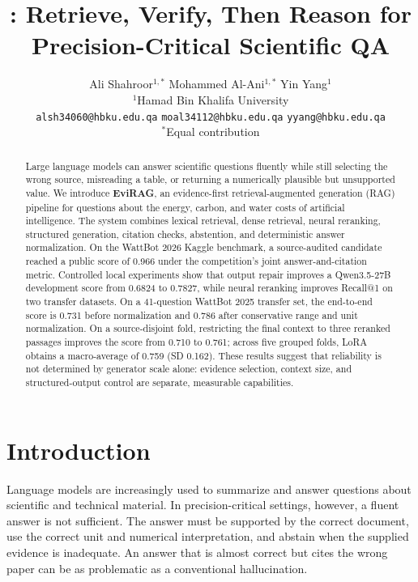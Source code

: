 \documentclass[11pt]{article}
\title{\method: Retrieve, Verify, Then Reason for Precision-Critical Scientific QA}
\author{
  Ali Shahroor$^{1,*}$ \quad
  Mohammed Al-Ani$^{1,*}$ \quad
  Yin Yang$^{1}$ \\
  $^{1}$Hamad Bin Khalifa University \\
  \texttt{alsh34060@hbku.edu.qa} \quad
  \texttt{moal34112@hbku.edu.qa} \quad
  \texttt{yyang@hbku.edu.qa} \\
  \small $^*$Equal contribution
}
\newcommand{\method}{\textbf{EviRAG}}
\begin{document}
\maketitle
{}

\begin{abstract}
Large language models can answer scientific questions fluently while still selecting the wrong source, misreading a table, or returning a numerically plausible but unsupported value. We introduce \method, an evidence-first retrieval-augmented generation (RAG) pipeline for questions about the energy, carbon, and water costs of artificial intelligence. The system combines lexical retrieval, dense retrieval, neural reranking, structured generation, citation checks, abstention, and deterministic answer normalization. On the WattBot 2026 Kaggle benchmark, a source-audited candidate reached a public score of 0.966 under the competition's joint answer-and-citation metric. Controlled local experiments show that output repair improves a Qwen3.5-27B development score from 0.6824 to 0.7827, while neural reranking improves Recall@1 on two transfer datasets. On a 41-question WattBot 2025 transfer set, the end-to-end score is 0.731 before normalization and 0.786 after conservative range and unit normalization. On a source-disjoint fold, restricting the final context to three reranked passages improves the score from 0.710 to 0.761; across five grouped folds, LoRA obtains a macro-average of 0.759 (SD 0.162). These results suggest that reliability is not determined by generator scale alone: evidence selection, context size, and structured-output control are separate, measurable capabilities.
\end{abstract}

\section{Introduction}
\label{sec:intro}
Language models are increasingly used to summarize and answer questions about scientific and technical material. In precision-critical settings, however, a fluent answer is not sufficient. The answer must be supported by the correct document, use the correct unit and numerical interpretation, and abstain when the supplied evidence is inadequate. An answer that is almost correct but cites the wrong paper can be as problematic as a conventional hallucination.
\end{document}
